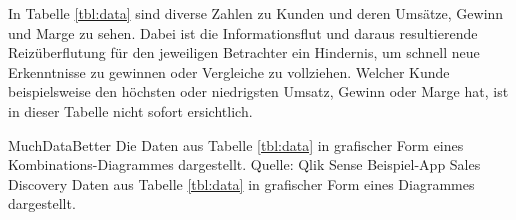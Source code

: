 
In Tabelle \ref{tbl:data} sind diverse Zahlen zu Kunden und deren Umsätze, Gewinn und Marge zu sehen.
Dabei ist die Informationsflut und daraus resultierende Reizüberflutung für den jeweiligen Betrachter ein Hindernis, um schnell neue Erkenntnisse zu gewinnen oder Vergleiche zu vollziehen.
Welcher Kunde beispielsweise den höchsten oder niedrigsten Umsatz, Gewinn oder Marge hat, ist in dieser Tabelle nicht sofort ersichtlich.

\bildbreit
{MuchDataBetter}
{Die Daten aus Tabelle \ref{tbl:data} in grafischer Form eines Kombinations-Diagrammes dargestellt. Quelle: Qlik Sense Beispiel-App \glqq Sales Discovery\grqq}
{Daten aus Tabelle \ref{tbl:data} in grafischer Form eines Diagrammes dargestellt. }

